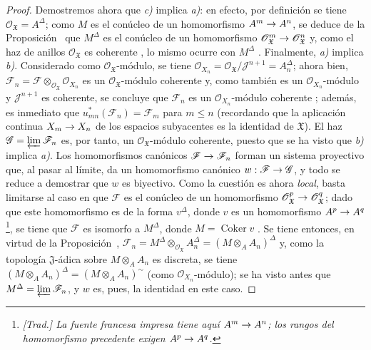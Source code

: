 \documentclass[oneside]{amsart}
\theoremstyle{ega-env-style}
\theoremstyle{ega-thm-env-style}
\theoremstyle{ega-defn-env-style}
\def\leq{\leqslant}                 %
\renewcommand{\to}{\mathchoice{\longrightarrow}{\rightarrow}{\rightarrow}{\rightarrow}}
\newcommand{\oldpage}[2][]{{\marginnote{\normalfont{\textbf{#1}~|~#2}}}\ignorespaces}
\begin{document}
\begin{proof}
Demostremos ahora que \emph{c)} implica \emph{a)}: en efecto, por definición se tiene $\mathscr{O}_{\mathfrak{X}}=A^\Delta$; como $M$ es el conúcleo de un homomorfismo $A^m\to A^n$, se deduce de la Proposición~ que $M^\Delta$ es el conúcleo de un homomorfismo $\mathscr{O}_{\mathfrak{X}}^m\to\mathscr{O}_{\mathfrak{X}}^n$ y, como el haz de anillos $\mathscr{O}_{\mathfrak{X}}$ es coherente , lo mismo ocurre con $M^\Delta$ .
\oldpage[I]{203}
Finalmente, \emph{a)} implica \emph{b)}.
Considerado como $\mathscr{O}_{\mathfrak{X}}$-módulo, se tiene $\mathscr{O}_{X_n}=\mathscr{O}_{\mathfrak{X}}/
\mathscr{J}^{n+1}=A_n^\Delta$; ahora bien, $\mathscr{F}_n=\mathscr{F}
\otimes_{\mathscr{O}_{\mathfrak{X}}}\mathscr{O}_{X_n}$ es un $\mathscr{O}_{\mathfrak{X}}$-módulo coherente  y, como también es un $\mathscr{O}_{X_n}$-módulo y $\mathscr{J}^{n+1}$ es coherente, se concluye que $\mathscr{F}_n$ es un $\mathscr{O}_{X_n}$-módulo coherente ; además, es inmediato que $u_{mn}^*(\mathscr{F}_n)=\mathscr{F}_m$ para $m\leq n$ (recordando que la aplicación continua $X_m\to X_n$ de los espacios subyacentes es la identidad de $\mathfrak{X}$).
El haz $\mathscr{G}=\varprojlim\mathscr{F}_n$ es, por tanto, un $\mathscr{O}_{\mathfrak{X}}$-módulo coherente, puesto que se ha visto que \emph{b)} implica \emph{a)}. Los homomorfismos canónicos $\mathscr{F}\to\mathscr{F}_n$ forman un sistema proyectivo que, al pasar al límite, da un homomorfismo canónico $w:\mathscr{F}\to\mathscr{G}$, y todo se reduce a demostrar que $w$ es biyectivo.
Como la cuestión es ahora \emph{local}, basta limitarse al caso en que $\mathscr{F}$ es el conúcleo de un homomorfismo $\mathscr{O}_{\mathfrak{X}}^p\to\mathscr{O}_{\mathfrak{X}}^q$; dado que este homomorfismo es de la forma $v^\Delta$, donde $v$ es un homomorfismo $A^p\to A^q$ \footnote{\emph{[Trad.] La fuente francesa impresa tiene aquí $A^m\to A^n$; los rangos del homomorfismo precedente exigen $A^p\to A^q$.}}, se tiene que $\mathscr{F}$ es isomorfo a $M^\Delta$, donde $M=\operatorname{Coker}v$ .
Se tiene entonces, en virtud de la Proposición~, $\mathscr{F}_n=M^\Delta\otimes_{\mathscr{O}_{\mathfrak{X}}}A_n^\Delta
=(M\otimes_A A_n)^\Delta$ y, como la topología $\mathfrak{J}$-ádica sobre $M\otimes_A A_n$ es discreta, se tiene $(M\otimes_A A_n)^\Delta=(M\otimes_A A_n)^{\sim}$ (como $\mathscr{O}_{X_n}$-módulo); se ha visto antes que $M^\Delta=\varprojlim\mathscr{F}_n$, y $w$ es, pues, la identidad en este caso.
\end{proof}
\end{document}
